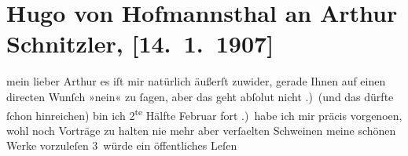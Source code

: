 

         
         \renewcommand{\erwaehntePersonen}{Personen: Richard Beer-Hofmann, Hugo von Hofmannsthal, Felix Salten, Jakob Wassermann}
         \renewcommand{\erwaehnteInstitutionen}{Institutionen: Galerie Miethke}
         \renewcommand{\erwaehnteOrte}{Orte: Wien}
         \renewcommand{\erwaehnteWerke}{Werke: Das Los der Juden, Der Dichter und diese Zeit, Der Ernst des Lebens, Lieutenant Gustl. Novelle, Schlaflied für Mirjam}
               \section[Hugo von Hofmannsthal an Arthur Schnitzler, {[}14. 1. 1907{]}]{ Hugo von Hofmannsthal an Arthur Schnitzler, {[}14. 1. 1907{]}}\nopagebreak{}\rehead{ }\begin{ledgroupsized}[t]{13cm}\normalsize\beginnumbering{} \toendnotes[C]{\smallbreak\pagebreak[2]} 
\toendnotes[C]{\smallbreak}\pstart{}{\pb}mein lieber Arthur\pend\pstart
           es iſt mir natürlich äußerſt zuwider, gerade Ihnen auf einen directen Wunſch  »nein« zu ſagen, aber das geht abſolut nicht\pend
           .) (und das dürfte ſchon hinreichen) bin ich 2\textsuperscript{te}
                  Hälfte Februar fort\pend
           .) habe ich mir präcis vorgeno{\geminationm}en, wohl noch Vorträge
               zu halten nie mehr aber verſa{\geminationm}elten Schweinen meine
               schönen Werke vorzuleſen\pend
           \pstart
           {\pb}3 würde ein öffentliches Leſen

\end{ledgroupsized}
